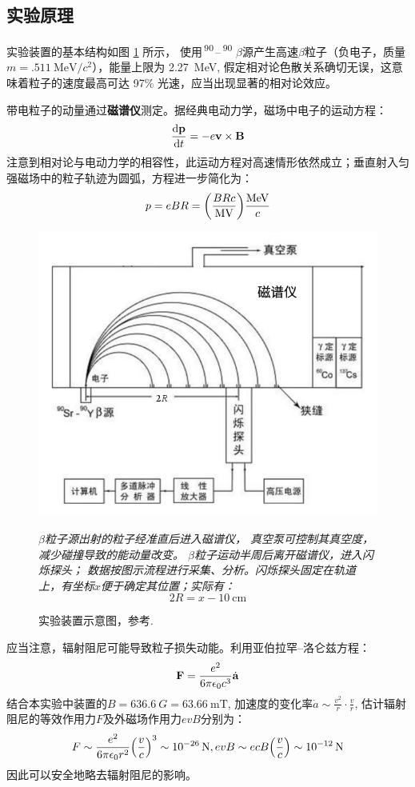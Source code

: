 \documentclass{buaaemp}
\newcommand{\SrAtom}{\,\textsuperscript{90}\tup{Sr}\,}
\newcommand{\Yatom}{\,\textsuperscript{90}\tup{Y}\,}	\newcommand{\CsAtom}{\,\textsuperscript{137}\tup{Cs}\,}	\newcommand{\CoAtom}{\,\textsuperscript{60}\tup{Cs}\,}
\begin{document}
\subsection{实验原理}
实验装置的基本结构如图 \ref{fig:app} 所示，
	使用\SrAtom--\Yatom\,$\beta$源产生高速$\beta$粒子（负电子，质量$m = \SI{.511}{\MeV/c^2}$），能量上限为 \SI{2.27}{\MeV}, 假定相对论色散关系确切无误，这意味着粒子的速度最高可达 97\% 光速，应当出现显著的相对论效应。
	
	带电粒子的动量通过\textbf{磁谱仪}测定。据经典电动力学，磁场中电子的运动方程：
	\begin{equation}
		\dv{\vb{p}}{t} = -e\vb{v}\times\vb{B}
	\end{equation}
	注意到相对论与电动力学的相容性，此运动方程对高速情形依然成立；垂直射入匀强磁场中的粒子轨迹为圆弧，方程进一步简化为：
	\begin{equation}
		p = eBR = \pqty{\frac{BRc}{\si{M\V}}} \frac{\si{\MeV}}{c}
	\end{equation}
	
	\begin{figure}[!h]
	\vspace{-3ex}
	\centering
	\includegraphics[width=.6\linewidth]{image/app+.png}
	\caption[装置]{实验装置示意图，参考\cite{钱建强2016近代物理实验}. 
		\vspace{-.5ex}}
	\raggedright\small
	\textit{\hphantom{说明}
		$\beta$粒子源出射的粒子经准直后进入磁谱仪，
		真空泵可控制其真空度，减少碰撞导致的能动量改变。
		$\beta$粒子运动半周后离开磁谱仪，进入闪烁探头；
		数据按图示流程进行采集、分析。闪烁探头固定在轨道上，有坐标$x$便于确定其位置；实际有：\vspace{-1.2ex}
		\[2R = x - \SI{10}{\cm}\]}
	\vspace{-2ex}
	\label{fig:app}
	\end{figure}
	
	应当注意，辐射阻尼可能导致粒子损失动能。利用亚伯拉罕--洛仑兹方程：
	\begin{equation}
		\vb{F} = \frac{e^2}{6\pi\epsilon_0 c^3} \dot{\vb{a}}
	\end{equation}
	结合本实验中装置的$B = \SI{636.6}{G} = \SI{63.66}{\milli\tesla}$, 加速度的变化率$\dot{a} \sim \frac{v^2}{r} \cdot \frac{v}{r}$, 估计辐射阻尼的等效作用力$F$及外磁场作用力$evB$分别为：
	\begin{equation}
		F \sim \frac{e^2}{6\pi\epsilon_0 r^2}
			\pqty{\frac{v}{c}}^3
			\sim \SI{e-26}{\N},\\
		evB \sim ecB \pqty{\frac{v}{c}}
			\sim \SI{e-12}{\N}
	\end{equation}
	因此可以安全地略去辐射阻尼的影响。
	
\end{document}

